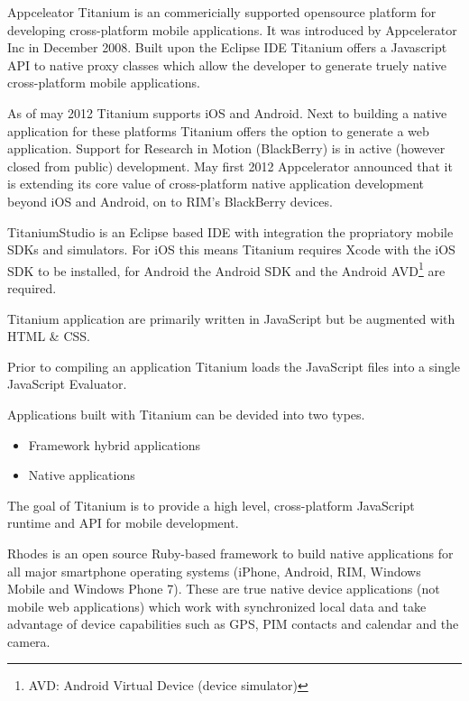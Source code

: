 Appceleator Titanium is an commericially supported opensource platform for developing cross-platform mobile applications. It was introduced by Appcelerator Inc in December 2008. Built upon the Eclipse IDE Titanium offers a Javascript API to native proxy classes which allow the developer to generate truely native cross-platform mobile applications. 

As of may 2012 Titanium supports iOS and Android. Next to building a native application for these platforms Titanium offers the option to generate a web application. 
Support for Research in Motion (BlackBerry) is in active (however closed from public) development. May first 2012 Appcelerator announced that it is extending its core value of cross-platform native application development beyond iOS and Android, on to RIM's BlackBerry devices.\cite{Asher2012}

TitaniumStudio is an Eclipse based IDE with integration the propriatory mobile SDKs and simulators. For iOS this means Titanium requires Xcode with the iOS SDK to be installed, for Android the Android SDK and the Android AVD\footnote{AVD: Android Virtual Device (device simulator)} are required.

Titanium application are primarily written in JavaScript but be augmented with HTML \& CSS. 

Prior to compiling an application Titanium loads the JavaScript files into a single JavaScript Evaluator. 

Applications built with Titanium can be devided into two types.

\begin{itemize}
	\item
	Framework hybrid applications
	\item
	Native applications
\end{itemize}

The goal of Titanium is to provide a high level, cross-platform JavaScript runtime and API for mobile development.\cite{Whinnery2012}

Rhodes is an open source Ruby-based framework to build native applications for all major smartphone operating systems (iPhone, Android, RIM, Windows Mobile and Windows Phone 7). These are true native device applications (not mobile web applications) which work with synchronized local data and take advantage of device capabilities such as GPS, PIM contacts and calendar and the camera. %

